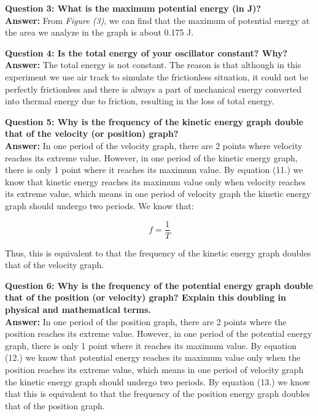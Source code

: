 \documentclass{article}
\begin{document}
\textbf{Question 3: What is the maximum potential energy (in J)?}\\
\textbf{Answer:} From \textit{Figure (3)}, we can find that the maximum of potential energy at the area we analyze in the graph is about 0.175 J.

\textbf{Question 4: Is the total energy of your oscillator constant? Why?}\\
\textbf{Answer:} The total energy is not constant. The reason is that although in this experiment we use air track to simulate the frictionless situation, it could not be perfectly frictionless and there is always a part of mechanical energy converted into thermal energy due to friction, resulting in the loss of total energy.

\textbf{Question 5: Why is the frequency of the kinetic energy graph double that of the velocity (or position) graph?}\\
\textbf{Answer:} In one period of the velocity graph, there are 2 points where velocity reaches its extreme value. However, in one period of the kinetic energy graph, there is only 1 point where it reaches its maximum value. By equation (11.) we know that kinetic energy reaches its maximum value only when velocity reaches its extreme value, which means in one period of velocity graph the kinetic energy graph should undergo two periods. We know that:

\begin{equation}
f=\frac{1}{T}
\end{equation}

Thus, this is equivalent to that the frequency of the kinetic energy graph doubles that of the velocity graph.

\textbf{Question 6: Why is the frequency of the potential energy graph double that of the position (or velocity) graph? Explain this doubling in physical and mathematical terms.}\\
\textbf{Answer:} In one period of the position graph, there are 2 points where the position reaches its extreme value. However, in one period of the potential energy graph, there is only 1 point where it reaches its maximum value. By equation (12.) we know that potential energy reaches its maximum value only when the position reaches its extreme value, which means in one period of velocity graph the kinetic energy graph should undergo two periods. By equation (13.) we know that this is equivalent to that the frequency of the position energy graph doubles that of the position graph.
\end{document}
